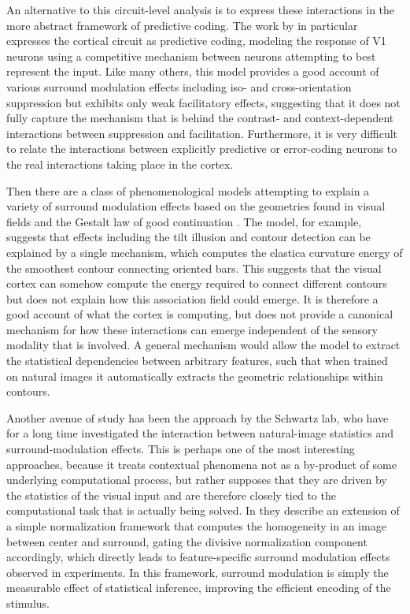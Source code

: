 An alternative to this circuit-level analysis is to express these
interactions in the more abstract framework of predictive coding. The
work by \cite{Spratling2010} in particular expresses the cortical
circuit as predictive coding, modeling the response of V1 neurons
using a competitive mechanism between neurons attempting to best
represent the input. Like many others, this model provides a good
account of various surround modulation effects including iso- and
cross-orientation suppression but exhibits only weak facilitatory
effects, suggesting that it does not fully capture the mechanism that
is behind the contrast- and context-dependent interactions between
suppression and facilitation. Furthermore, it is very difficult to
relate the interactions between explicitly predictive or error-coding
neurons to the real interactions taking place in the cortex.

Then there are a class of phenomenological models attempting to
explain a variety of surround modulation effects based on the
geometries found in visual fields and the Gestalt law of good
continuation \citep{Field1993}. The \cite{Keemink2015} model, for
example, suggests that effects including the tilt illusion and contour
detection can be explained by a single mechanism, which computes the
elastica curvature energy of the smoothest contour connecting oriented
bars. This suggests that the visual cortex can somehow compute the
energy required to connect different contours but does not explain how
this association field could emerge. It is therefore a good account of
what the cortex is computing, but does not provide a canonical
mechanism for how these interactions can emerge independent of the
sensory modality that is involved. A general mechanism would allow the
model to extract the statistical dependencies between arbitrary
features, such that when trained on natural images it automatically
extracts the geometric relationships within contours.

Another avenue of study has been the approach by the Schwartz lab, who
have for a long time investigated the interaction between
natural-image statistics and surround-modulation effects. This is
perhaps one of the most interesting approaches, because it treats
contextual phenomena not as a by-product of some underlying
computational process, but rather supposes that they are driven by the
statistics of the visual input and are therefore closely tied to the
computational task that is actually being solved. In \cite{Coen2015}
they describe an extension of a simple normalization framework that
computes the homogeneity in an image between center and surround,
gating the divisive normalization component accordingly, which
directly leads to feature-specific surround modulation effects
observed in experiments. In this framework, surround modulation is
simply the measurable effect of statistical inference, improving the
efficient encoding of the stimulus.

